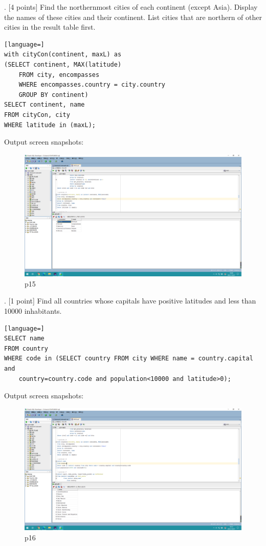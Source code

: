 \documentclass[]{article}
\begin{document}
	. [4 points] Find the northernmost cities of each continent (except Asia). Display the names of these cities and their continent. List cities that are northern of other cities in the result table first.   \\
	
	\begin{lstlisting}[language=] 
with cityCon(continent, maxL) as 
(SELECT continent, MAX(latitude)
	FROM city, encompasses
	WHERE encompasses.country = city.country
	GROUP BY continent)
SELECT continent, name
FROM cityCon, city
WHERE latitude in (maxL);
	\end{lstlisting} 
	Output screen snapshots:
	\begin{figure}[H]
		\centering
		\includegraphics[width=0.92\linewidth]{../screen/p15}
		\caption{p15}
		\label{fig:p15}
	\end{figure}
	
	. [1 point] Find all countries whose capitals have positive latitudes and less than 10000 inhabitants.   \\
	
	\begin{lstlisting}[language=] 
SELECT name
FROM country
WHERE code in (SELECT country FROM city WHERE name = country.capital and 
	country=country.code and population<10000 and latitude>0);
	\end{lstlisting} 
	Output screen snapshots:
	\begin{figure}[H]
		\centering
		\includegraphics[width=0.95\linewidth]{../screen/p16}
		\caption{p16}
		\label{fig:p16}
	\end{figure}
	
\end{document}
